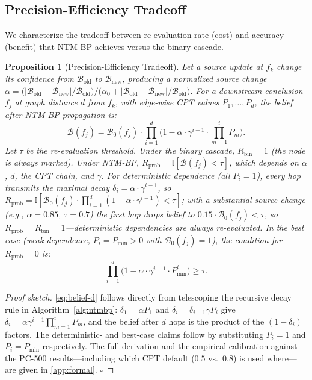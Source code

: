 \documentclass{article}
\newtheorem{proposition}[theorem]{Proposition}
\theoremstyle{definition}
\begin{document}
\subsection{Precision-Efficiency Tradeoff}

We characterize the tradeoff between re-evaluation rate (cost) and
accuracy (benefit) that NTM-BP achieves versus the binary cascade.

\begin{proposition}[Precision-Efficiency Tradeoff]
\label{thm:tradeoff}
Let a source update at $f_k$ change its confidence from
$\mathcal{B}_{\text{old}}$ to $\mathcal{B}_{\text{new}}$, producing a
normalized source change
$\alpha = \big(|\mathcal{B}_{\text{old}} - \mathcal{B}_{\text{new}}| /
\mathcal{B}_{\text{old}}\big) \big/ \big(\alpha_0 +
|\mathcal{B}_{\text{old}} - \mathcal{B}_{\text{new}}| /
\mathcal{B}_{\text{old}}\big)$.  For a downstream conclusion $f_j$ at
graph distance $d$ from $f_k$, with edge-wise CPT values
$P_1,\ldots,P_d$, the belief after NTM-BP propagation is:
\begin{equation}
  \mathcal{B}(f_j) = \mathcal{B}_0(f_j) \cdot
  \prod_{i=1}^{d}\Big(1 - \alpha\cdot\gamma^{i-1}\cdot
  \prod_{m=1}^{i}P_m\Big).
  \label{eq:belief-d}
\end{equation}
Let $\tau$ be the re-evaluation threshold.  Under the binary cascade,
$R_{\text{bin}}=1$ (the node is always marked).  Under NTM-BP,
$R_{\text{prob}} = \mathbb{I}[\mathcal{B}(f_j) < \tau]$, which depends
on $\alpha$, $d$, the CPT chain, and $\gamma$.  For deterministic
dependence (all $P_i=1$), every hop transmits the maximal decay
$\delta_i = \alpha\cdot\gamma^{i-1}$, so
$R_{\text{prob}} = \mathbb{I}[\mathcal{B}_0(f_j)\cdot
\prod_{i=1}^{d}(1-\alpha\cdot\gamma^{i-1}) < \tau]$; with a
substantial source change (e.g., $\alpha=0.85$, $\tau=0.7$) the
first hop drops belief to $0.15\cdot\mathcal{B}_0(f_j) < \tau$, so
$R_{\text{prob}}=R_{\text{bin}}=1$---deterministic dependencies are
always re-evaluated.  In the best case (weak dependence,
$P_i=P_{\min}>0$ with $\mathcal{B}_0(f_j)=1$), the condition for
$R_{\text{prob}}=0$ is:
\begin{equation}
  \prod_{i=1}^{d}\Big(1 - \alpha\cdot\gamma^{i-1}\cdot P_{\min}^{i}\Big)
  \geq \tau.
  \label{eq:retention-condition}
\end{equation}
\end{proposition}

\begin{proof}[Proof sketch]
\cref{eq:belief-d} follows directly from telescoping the recursive decay
rule in Algorithm~\ref{alg:ntmbp}: $\delta_1=\alpha P_1$ and
$\delta_i=\delta_{i-1}\gamma P_i$ give
$\delta_i=\alpha\gamma^{i-1}\prod_{m=1}^{i}P_m$, and the belief after $d$
hops is the product of the $(1-\delta_i)$ factors.  The deterministic-
and best-case claims follow by substituting $P_i=1$ and $P_i=P_{\min}$
respectively.  The full derivation and the empirical calibration against
the PC-500 results---including which CPT default ($0.5$ vs.\ $0.8$) is
used where---are given in \cref{app:formal}.
\hfill$\square$
\end{proof}
\end{document}
